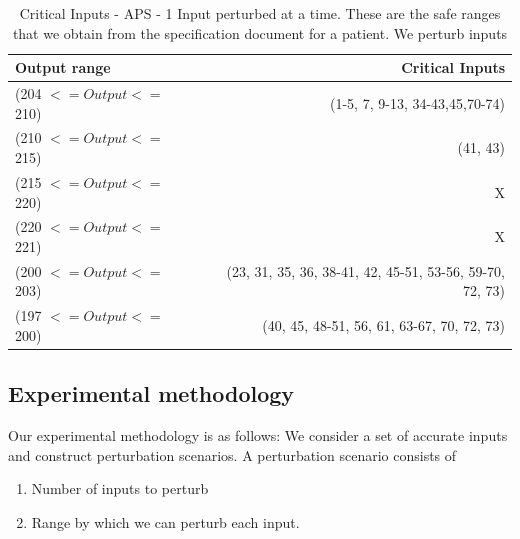 \begin{table}[h!]
	\begin{center}
		\caption{Critical Inputs - APS - 1 Input perturbed at a time. These are the safe ranges that we obtain from the specification document for a patient. We perturb inputs   }
		\label{criticalinputs}
		\begin{tabular}{|l|r|}
			\textbf{Output range}  & \textbf{Critical Inputs}  \\
			\hline
			(204 $<= Output <=$ 210)&  (1-5, 7, 9-13, 34-43,45,70-74) \\
			
			
			(210 $<= Output <=$ 215) &   (41, 43)\\
			(215 $<= Output <=$ 220) &  X \\
			(220 $<= Output <=$ 221) &  X \\
			(200 $<= Output <=$ 203) &  (23, 31, 35, 36, 38-41, 42, 45-51, 53-56, 59-70, 72, 73) \\
			(197 $<= Output <=$200) & (40, 45, 48-51, 56, 61, 63-67, 70, 72, 73)\\
			\hline
			\hline
			
			
		\end{tabular}
	\end{center}
\end{table}

\subsection{Experimental methodology}

Our experimental methodology is as follows:
We consider a set of accurate inputs and construct perturbation scenarios.
A perturbation scenario consists of
\begin{enumerate}
	\item  Number of inputs to perturb
	\item  Range by which we can perturb each input. 
\end{enumerate}
	
